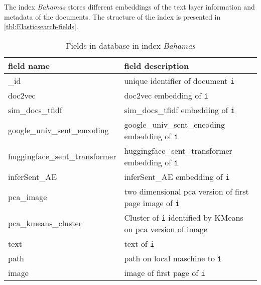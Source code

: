 The index \textit{Bahamas} stores different embeddings of the text layer information and metadata of the documents.
The structure of the index is presented in \autoref{tbl:Elasticsearch-fields}.

\begin{table}[]
    \caption{Fields in \databaseName{} database in index \textit{Bahamas}}
    \begin{tabular}{|
    >{\columncolor[HTML]{EFEFEF}}l |p{}|}
    \hline
    \cellcolor[HTML]{C0C0C0}\textbf{field name} & \cellcolor[HTML]{C0C0C0}\textbf{field description}                                                        \\ \hline
    \_id                                        & unique identifier of document \texttt{i}                                                 \\ \hline
    doc2vec                                     & doc2vec embedding of \texttt{i}                                                          \\ \hline
    sim\_docs\_tfidf                            & sim\_docs\_tfidf embedding of \texttt{i}                                                 \\ \hline
    google\_univ\_sent\_encoding                & google\_univ\_sent\_encoding embedding of \texttt{i}                                     \\ \hline
    huggingface\_sent\_transformer              & huggingface\_sent\_transformer embedding of \texttt{i}                                   \\ \hline
    inferSent\_AE                               & inferSent\_AE embedding of \texttt{i}                                                    \\ \hline
    pca\_image                                  & two dimensional \ac{pca} version of first page image of \texttt{i}                      \\ \hline
    pca\_kmeans\_cluster                        & Cluster of \texttt{i} identified by KMeans on \ac{pca} version of image                 \\ \hline
    text                                        & text of \texttt{i}                                                                       \\ \hline
    path                                        & path on local maschine to \texttt{i}                                                     \\ \hline
    image                                       & image of first page of \texttt{i}                                                        \\ \hline
    \end{tabular}
    \label{tbl:Elasticsearch-fields}
\end{table}


